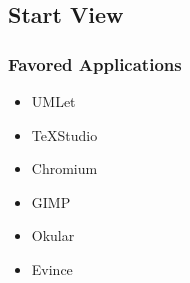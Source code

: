 \subsection{Start View}

    \subsubsection{Favored Applications}
    \begin{itemize}
        \item UMLet
        \item TeXStudio
        \item Chromium
        \item GIMP
        \item Okular
        \item Evince
    \end{itemize}